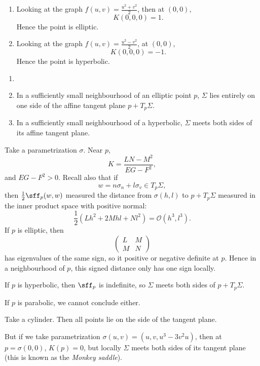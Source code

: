 \documentclass[12pt]{article}
\begin{document}
\begin{exbox}
	\begin{enumerate}
		\item Looking at the graph $f(u, v) = \frac{u^2+v^2}{2}$, then at $(0,0)$,
			\[
			K(0,0,0) = 1
			.\]
			Hence the point is elliptic.
		\item Looking at the graph $f(u, v) = \frac{u^2 - v^2}{2}$, at $(0, 0)$,
			\[
			K(0,0,0) = -1
			.\]
			Hence the point is hyperbolic.
	\end{enumerate}
\end{exbox}

\begin{lemma}
	\begin{enumerate}[\normalfont(a)]
		\item[]
		\item In a sufficiently small neighbourhood of an elliptic point $p$, $\Sigma$ lies entirely on one side of the affine tangent plane $p + T_p\Sigma$.
		\item In a sufficiently small neighbourhood of a hyperbolic, $\Sigma$ meets both sides of its affine tangent plane.
	\end{enumerate}
\end{lemma}

\begin{proofbox}
	Take a parametrization $\sigma$. Near $p$,
	\[
	K = \frac{LN-M^2}{EG-F^2}
	,\]
	and $EG-F^2 > 0$. Recall also that if
	\[
	w = n \sigma_n + l \sigma_v \in T_p \Sigma
	,\]
	then $\frac{1}{2} \sff_p(w, w)$ measured the distance from $\sigma(h, l)$ to $p + T_p \Sigma$ measured in the inner product space with positive normal:
	\[
	\frac{1}{2} (Lh^2 + 2Mhl + Nl^2) = \mathcal{O}(h^3,l^3)
	.\]
	If $p$ is elliptic, then
	\[
	\begin{pmatrix}
		L & M \\ M & N
	\end{pmatrix}
	\]
	has eigenvalues of the same sign, so it positive or negative definite at $p$. Hence in a neighbourhood of $p$, this signed distance only has one sign locally.

	If $p$ is hyperbolic, then $\sff_p$ is indefinite, so $\Sigma$ meets both sides of $p + T_p\Sigma$.
\end{proofbox}

\begin{remark}
	If $p$ is parabolic, we cannot conclude either.

	Take a cylinder. Then all points lie on the side of the tangent plane. 

	But if we take parametrization $\sigma(u, v) = (u, v, u^3 - 3v^2u)$, then at $p = \sigma(0,0)$, $K(p) = 0$, but locally $\Sigma$ meets both sides of its tangent plane (this is known as the \emph{Monkey saddle}).
\end{remark}
\end{document}

